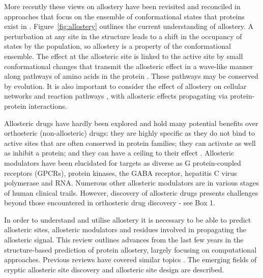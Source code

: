 More recently these views on allostery have been revisited and reconciled in approaches that focus on the ensemble of conformational states that proteins exist in \cite{Motlagh2014, Cui2008}.
Figure~\ref{fig:allostery} outlines the current understanding of allostery.
A perturbation at any site in the structure leads to a shift in the occupancy of states by the population, so allostery is a property of the conformational ensemble.
The effect at the allosteric site is linked to the active site by small conformational changes that transmit the allosteric effect in a wave-like manner along pathways of amino acids in the protein \cite{DelSol2009}.
These pathways may be conserved by evolution.
It is also important to consider the effect of allostery on cellular networks and reaction pathways \cite{Nussinov2013}, with allosteric effects propagating via protein-protein interactions.

Allosteric drugs have hardly been explored and hold many potential benefits over orthosteric (non-allosteric) drugs: they are highly specific as they do not bind to active sites that are often conserved in protein families; they can activate as well as inhibit a protein; and they can have a ceiling to their effect \cite{Wenthur2014}.
Allosteric modulators have been elucidated for targets as diverse as G protein-coupled receptors (GPCRs), protein kinases, the GABA receptor, hepatitis C virus polymerase and RNA.
Numerous other allosteric modulators are in various stages of human clinical trails.
However, discovery of allosteric drugs presents challenges beyond those encountered in orthosteric drug discovery - see Box 1.

In order to understand and utilise allostery it is necessary to be able to predict allosteric sites, allosteric modulators and residues involved in propagating the allosteric signal.
This review outlines advances from the last few years in the structure-based prediction of protein allostery, largely focusing on computational approaches.
Previous reviews have covered similar topics \cite{SchuelerFurman2016, Wagner2016, Guarnera2016, Lu2014}.
The emerging fields of cryptic allosteric site discovery and allosteric site design are described.



